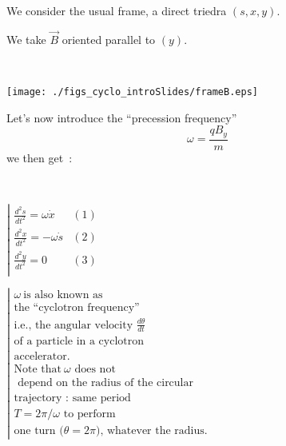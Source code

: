\documentclass[12pt]{paper}
\newcommand{\B}{\ensuremath{\vec B}}
\newcommand{\nin}{\noindent}
\newcommand{\blue}{\color{blue}}
\begin{document}
\hfill
\begin{minipage}[b]{.27\linewidth}
\centering
\Large

\blue 
We consider the usual  frame, a direct triedra  $(s,x,y)$. 

We take $\B$  oriented parallel to $(y)$. 

~

\texttt{[image: ./figs\_cyclo\_introSlides/frameB.eps]}

\end{minipage}




\clearpage 


\begin{minipage}[b]{.50\linewidth}

\nin Let's now  introduce the ``precession frequency''  
$$ \omega = \frac{\textstyle{qB_y}}{\textstyle{m}}$$
we then get~: ~ ~ ~  

~

\begin{center}
$\left| 
\begin{array}{lr} 
\frac{\textstyle{d^2s}}{\textstyle{dt^2}} = \omega \dot x     & (1)\\
\frac{\textstyle{d^2x}}{\textstyle{dt^2}} = - \omega \dot s    & (2)\\
\frac{\textstyle{d^2y}}{\textstyle{dt^2}} = 0             & (3)\\
\end{array} 
\right.$
\end{center}


\end{minipage}
\hfill
\begin{minipage}[b]{.42\linewidth}
\centering
\Large
\blue
\begin{center}
$\left| 
\begin{array}{lr} 
\omega ~ \textrm{is also known as }\\
\textrm{the ``cyclotron frequency''} \\
\textrm{i.e., the angular velocity } \frac{\textstyle{d\theta}}{\textstyle{dt}} \\
\textrm{of a particle in a cyclotron } \\
\textrm{accelerator. } \\
\textrm{Note that} ~ \omega \textrm{ does not}  \\
\textrm{ depend on the radius of the circular }  \\
\textrm{trajectory~: same period }    \\
\textrm{$T=2\pi/\omega$ to perform   }  \\
\textrm{one turn ($\theta = 2\pi$), whatever the radius. }  
\end{array} 
\right.$
\end{center}



\end{minipage}
\end{document}
